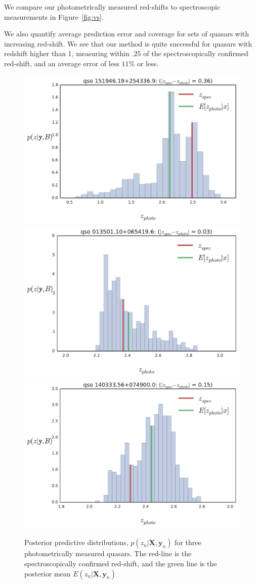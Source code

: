 \documentclass{article}
\begin{document}
We compare our photometrically measured red-shifts to spectroscopic measurements in Figure~\ref{fig:vs}.  

We also quantify average prediction error and coverage for sets of quasars with increasing red-shift.  We see that our method is quite successful for quasars with redshift higher than 1, measuring within $.25$ of the spectroscopically confirmed red-shift, and an average error of less $11 \%$ or less.  

\begin{figure}[t]
\vskip 0.2in
\begin{center}
\centerline{
\includegraphics[width=.66\columnwidth]{../figs/quasar_plots/quasar_94_posterior_z}
\includegraphics[width=.66\columnwidth]{../figs/quasar_plots/quasar_49_posterior_z}
\includegraphics[width=.66\columnwidth]{../figs/quasar_plots/quasar_22_posterior_z}
}
\vskip -0.2in
\caption{Posterior predictive distributions, $p(z_n | \mathbf{X}, \mathbf{y}_n)$ for three photometrically measured quasars. The red-line is the spectroscopically confirmed red-shift, and the green line is the posterior mean $E(z_n |\mathbf{X}, \mathbf{y}_n)$ }
\label{fig:marginals}
\end{center}
\end{figure}
\end{document}
